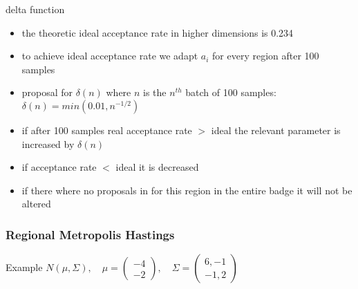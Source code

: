 \begin{frame}
\begin{block}{delta function}
\begin{itemize} 
\item the theoretic ideal acceptance rate in higher dimensions is 0.234
\item to achieve ideal acceptance rate we adapt $a_i$ for every region after 100 samples
\item proposal for $\delta(n)$ where $n$ is the $n^{th}$ batch of 100 samples:\\
$\delta(n) = min(0.01,n^{-1/2})$
\item if after 100 samples real acceptance rate $>$ ideal the relevant parameter is increased by $\delta(n)$
\item if acceptance rate $<$ ideal it is decreased
\item if there where no proposals in for this region in the entire badge it will not be altered 
\end{itemize}
\end{block}
\end{frame}


\begin{frame}
\frametitle{Regional Metropolis Hastings}
\begin{block}{Example}
$N(\mu, \Sigma), \quad \mu = \begin{pmatrix} -4 \\ -2
\end{pmatrix} , \quad \Sigma = \begin{pmatrix} 6,-1 \\ -1,2
\end{pmatrix}$
\end{block}
\end{frame}